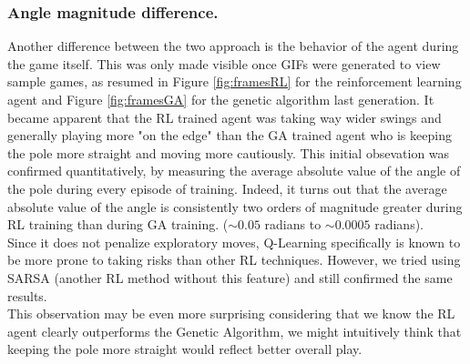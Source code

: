\subsubsection{Angle magnitude difference.}
Another difference between the two approach is the behavior of the agent during the game itself.
This was only made visible once GIFs were generated to view sample games, as resumed in Figure \ref{fig:framesRL} for the reinforcement learning agent and Figure \ref{fig:framesGA} for the genetic algorithm last generation. 
It became apparent that the RL trained agent was taking way wider swings and generally playing more "on the edge" than the GA trained agent who is keeping the pole more straight and moving more cautiously.
This initial obsevation was confirmed quantitatively, by measuring the average absolute value of the angle of the pole during every episode of training.
Indeed, it turns out that the average absolute value of the angle is consistently two orders of magnitude greater during RL training than during GA training. ($ \sim 0.05$ radians to $\sim 0.0005$ radians).
\\
Since it does not penalize exploratory moves, Q-Learning specifically is known to be more prone to taking risks than other RL techniques. 
However, we tried using SARSA (another RL method without this feature) and still confirmed the same results.
\\
This observation may be even more surprising considering that we know the RL agent clearly outperforms the Genetic Algorithm, we might intuitively think that keeping the pole more straight would reflect better overall play.



